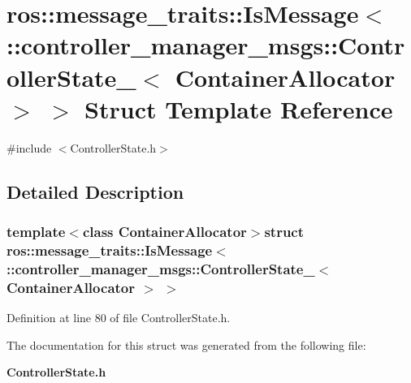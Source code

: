 \section{ros\-:\-:message\-\_\-traits\-:\-:\-Is\-Message$<$ \-:\-:controller\-\_\-manager\-\_\-msgs\-:\-:\-Controller\-State\-\_\-$<$ \-Container\-Allocator $>$ $>$ \-Struct \-Template \-Reference}
\label{structros_1_1message__traits_1_1IsMessage_3_01_1_1controller__manager__msgs_1_1ControllerState__2e4804cd7f00323435ae7bf72a6cdcf7}


{\ttfamily \#include $<$\-Controller\-State.\-h$>$}



\subsection{\-Detailed \-Description}
\subsubsection*{template$<$class Container\-Allocator$>$struct ros\-::message\-\_\-traits\-::\-Is\-Message$<$ \-::controller\-\_\-manager\-\_\-msgs\-::\-Controller\-State\-\_\-$<$ Container\-Allocator $>$ $>$}



\-Definition at line 80 of file \-Controller\-State.\-h.



\-The documentation for this struct was generated from the following file\-:\begin{DoxyCompactItemize}
\item 
{\bf \-Controller\-State.\-h}\end{DoxyCompactItemize}
